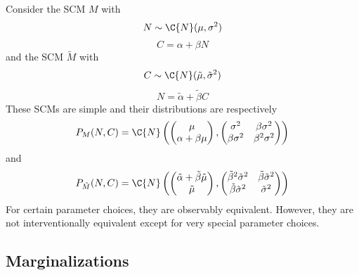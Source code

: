 \begin{Eg}
Consider the SCM $M$ with
$$N \sim \C{N}(\mu,\sigma^2)$$
$$C = \alpha + \beta N$$
and the SCM $\tilde{M}$ with
$$C \sim \C{N}(\tilde{\mu},\tilde{\sigma}^2)$$
$$N = \tilde{\alpha} + \tilde{\beta} C$$
These SCMs are simple and their distributions are respectively 
  $$P_M(N,C) = \C{N}\left(\begin{pmatrix} \mu \\ \alpha + \beta \mu \end{pmatrix}, \begin{pmatrix} \sigma^2 & \beta\sigma^2 \\ \beta\sigma^2 & \beta^2\sigma^2\end{pmatrix}\right)$$
and
  $$P_{\tilde{M}}(N,C) = \C{N}\left(\begin{pmatrix} \tilde{\alpha} + \tilde{\beta} \tilde{\mu} \\ \tilde{\mu} \end{pmatrix}, \begin{pmatrix} \tilde{\beta}^2\tilde{\sigma}^2 & \tilde{\beta}\tilde{\sigma}^2 \\ \tilde{\beta}\tilde{\sigma}^2 & \tilde{\sigma}^2\end{pmatrix}\right)$$
For certain parameter choices, they are observably equivalent.
However, they are not interventionally equivalent except for very special parameter choices.
\end{Eg}

\subsection{Marginalizations}

